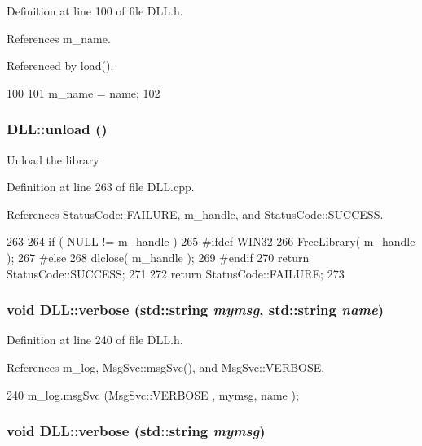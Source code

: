 Definition at line 100 of file DLL.h.

References m\_\-name.

Referenced by load().


\begin{DoxyCode}
100                                 {
101     m_name = name;
102   }
\end{DoxyCode}
\hypertarget{classDLL_a10147aebd7b2688354f8c372d468d4aa}{
\subsubsection[{unload}]{ DLL::unload ()}}
\label{classDLL_a10147aebd7b2688354f8c372d468d4aa}
Unload the library 

Definition at line 263 of file DLL.cpp.

References StatusCode::FAILURE, m\_\-handle, and StatusCode::SUCCESS.


\begin{DoxyCode}
263                          {
264   if ( NULL != m_handle ){
265 #ifdef WIN32
266     FreeLibrary( m_handle );
267 #else
268     dlclose( m_handle );
269 #endif
270     return StatusCode::SUCCESS;
271   }
272   return StatusCode::FAILURE;
273 }
\end{DoxyCode}
\hypertarget{classDLL_a721fa58107b11bb96181219f06f517e3}{
\subsubsection[{verbose}]{\setlength{\rightskip}{0pt plus 5cm}void DLL::verbose (std::string {\em mymsg}, \/  std::string {\em name})}}
\label{classDLL_a721fa58107b11bb96181219f06f517e3}


Definition at line 240 of file DLL.h.

References m\_\-log, MsgSvc::msgSvc(), and MsgSvc::VERBOSE.


\begin{DoxyCode}
240 { m_log.msgSvc (MsgSvc::VERBOSE , mymsg, name ); }
\end{DoxyCode}
\hypertarget{classDLL_a3b019cc98993af67fdc9b07b1921251b}{
\subsubsection[{verbose}]{\setlength{\rightskip}{0pt plus 5cm}void DLL::verbose (std::string {\em mymsg})}}
\label{classDLL_a3b019cc98993af67fdc9b07b1921251b}


